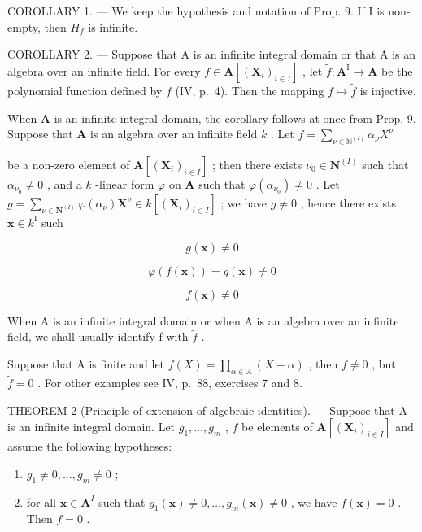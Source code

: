 COROLLARY 1. --- We keep the hypothesis and notation of Prop. 9. If I is non-empty, then \(H_{f}\) is infinite.

COROLLARY 2. --- Suppose that A is an infinite integral domain or that A is an algebra over an infinite field. For every \(f \in \mathbf{A}[(\mathbf{X}_i)_{i \in I}]\) , let \(\tilde{f}: \mathbf{A}^{\mathrm{I}} \to \mathbf{A}\) be the polynomial function defined by \(f\) (IV, p.~4). Then the mapping \(f \mapsto \tilde{f}\) is injective.

When \(\mathbf{A}\) is an infinite integral domain, the corollary follows at once from Prop. 9. Suppose that \(\mathbf{A}\) is an algebra over an infinite field \(k\) . Let \(f = \sum_{\nu \in \mathbb{N}^{(I)}} \alpha_{\nu} X^{\nu}\)

be a non-zero element of \(\mathbf{A}[(\mathbf{X}_i)_{i\in I}]\) ; then there exists \(\nu_0\in \mathbf{N}^{(I)}\) such that \(\alpha_{\nu_0}\neq 0\) , and a \(k\) -linear form \(\varphi\) on \(\mathbf{A}\) such that \(\varphi (\alpha_{\nu_0})\neq 0\) . Let \(g = \sum_{\nu \in \mathbf{N}^{(I)}}\varphi (\alpha_{\nu})\mathbf{X}^{\nu}\in k[(\mathbf{X}_i)_{i\in I}]\) ; we have \(g\neq 0\) , hence there exists \(\mathbf{x}\in k^{\mathrm{I}}\) such

\[
g (\mathbf {x}) \neq 0
\]

\[
\varphi (f (\mathbf {x})) = g (\mathbf {x}) \neq 0
\]

\[
f (\mathbf {x}) \neq 0
\]

When A is an infinite integral domain or when A is an algebra over an infinite field, we shall usually identify f with \(\tilde{f}\) .

Suppose that A is finite and let \(f(X) = \prod_{\alpha \in A} (X - \alpha)\) , then \(f \neq 0\) , but \(\tilde{f} = 0\) . For other examples see IV, p.~88, exercises 7 and 8.

THEOREM 2 (Principle of extension of algebraic identities). --- Suppose that A is an infinite integral domain. Let \(g_1, \ldots, g_m\) , \(f\) be elements of \(\mathbf{A}[(\mathbf{X}_i)_{i \in I}]\) and assume the following hypotheses:

\begin{enumerate}
\def\labelenumi{\alph{enumi})}
\item
  \(g_{1} \neq 0, \ldots, g_{m} \neq 0\) ;
\item
  for all \(\mathbf{x} \in \mathbf{A}^{I}\) such that \(g_1(\mathbf{x}) \neq 0, \ldots, g_m(\mathbf{x}) \neq 0\) , we have \(f(\mathbf{x}) = 0\) . Then \(f = 0\) .
\end{enumerate}

